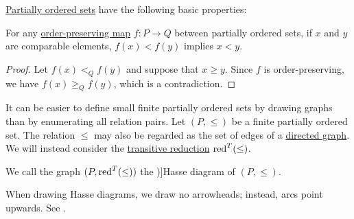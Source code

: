 \begin{proposition}\label{thm:def:partially_ordered_set}
  \hyperref[def:partially_ordered_set]{Partially ordered sets} have the following basic properties:
  \begin{thmenum}
     For any \hyperref[def:order_function/preserving]{order-preserving map} \( f: P \to Q \) between partially ordered sets, if \( x \) and \( y \) are comparable elements, \( f(x) < f(y) \) implies \( x < y \).
  \end{thmenum}
\end{proposition}
\begin{proof}
   Let \( f(x) <_Q f(y) \) and suppose that \( x \geq y \). Since \( f \) is order-preserving, we have \( f(x) \geq_Q f(y) \), which is a contradiction.
\end{proof}

\begin{definition}\label{def:hasse_diagram}
  It can be easier to define small finite partially ordered sets by drawing graphs than by enumerating all relation pairs. Let \( (P, \leq) \) be a finite partially ordered set. The relation \( \leq \) may also be regarded as the set of edges of a \hyperref[def:directed_graph]{directed graph}. We will instead consider the \hyperref[def:transitive_reduction]{transitive reduction} \( \operatorname{red}^T(\leq) \).

  We call the graph \( (P, \operatorname{red}^T(\leq)) \) the \term[ru=диаграмма Хассе (\cite[78]{Гуров2013Решётки})]{Hasse diagram} of \( (P, \leq) \).
\end{definition}
\begin{comments}
  \item When drawing Hasse diagrams, we draw no arrowheads; instead, arcs point upwards. See .
\end{comments}

